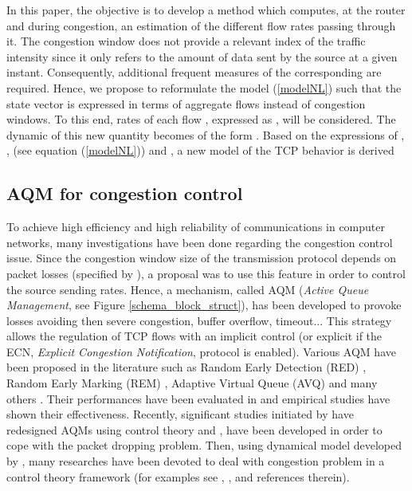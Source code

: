\documentclass[a4paper, 10pt, onecolumn]{article}
\begin{document}
In this paper, the objective is to develop a method which computes, at the router and during congestion, an estimation of the different flow rates passing through it. The congestion window  does not provide a relevant index of the traffic intensity since it only refers to the amount of data sent by the source at a given instant. Consequently, additional frequent measures of the corresponding  are required. Hence, we propose to reformulate the model (\ref{modelNL}) such that the state vector is expressed in terms of aggregate flows instead of congestion windows. To this end, rates of each flow , expressed as , will be considered. The dynamic of this new quantity becomes of the form . Based on the expressions of , ,  (see equation (\ref{modelNL})) and , a new model of the TCP behavior is derived



\subsection{AQM for congestion control}

To achieve high efficiency and high reliability of communications in computer networks, many investigations have been done regarding the congestion control issue. Since the congestion window size of the transmission protocol depends on packet losses (specified by ), a proposal was to use this feature in order to control the source sending rates. Hence, a mechanism, called AQM ({\it Active Queue Management}, see Figure \ref{schema_block_struct}), has been developed to provoke losses avoiding then severe congestion, buffer overflow, timeout... This strategy allows the regulation of TCP flows with an implicit control (or explicit if the ECN, {\it Explicit Congestion Notification}, protocol is enabled). Various AQM have been proposed in the literature such as Random Early Detection (RED) \cite{Flo93}, Random Early Marking (REM) \cite{Ath00}, Adaptive Virtual Queue (AVQ) \cite{Sri04} and many others \cite{Ryu04}. Their performances have been evaluated in \cite{Ryu04} and empirical studies have shown their effectiveness. Recently, significant studies initiated by \cite{Hol02} have redesigned AQMs using control theory and ,  have been developed in order to cope with the packet dropping problem. Then, using dynamical model developed by \cite{Mis00}, many researches have been devoted to deal with congestion problem in a control theory framework (for examples see \cite{Lab07b}, \cite{Kim06}, \cite{Tar05} and references therein).
\end{document}

